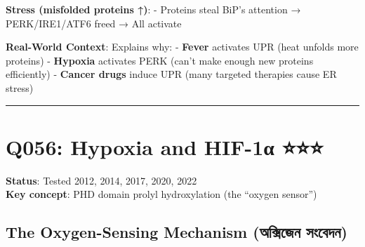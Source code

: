 \textbf{Stress (misfolded proteins ↑)}: - Proteins steal BiP's attention
→ PERK/IRE1/ATF6 freed → All activate

\textbf{Real-World Context}: Explains why: - \textbf{Fever} activates
UPR (heat unfolds more proteins) - \textbf{Hypoxia} activates PERK
(can't make enough new proteins efficiently) - \textbf{Cancer drugs}
induce UPR (many targeted therapies cause ER stress)

\begin{center}\rule{0.5\linewidth}{0.5pt}\end{center}

\hypertarget{q056-hypoxia-and-hif-1ux3b1}{%
\section{Q056: Hypoxia and HIF-1α
⭐⭐⭐}\label{q056-hypoxia-and-hif-1ux3b1}}

\textbf{Status}: Tested 2012, 2014, 2017, 2020, 2022\\
\textbf{Key concept}: PHD domain prolyl hydroxylation (the ``oxygen
sensor'')

\hypertarget{the-oxygen-sensing-mechanism-ux985ux995ux9b8ux99cux9a8-ux9b8ux9acux9a6ux9a8}{%
\subsection{\texorpdfstring{\textbf{The Oxygen-Sensing Mechanism}
(অক্সিজেন
সংবেদন)}{The Oxygen-Sensing Mechanism (অক্সিজেন সংবেদন)}}\label{the-oxygen-sensing-mechanism-ux985ux995ux9b8ux99cux9a8-ux9b8ux9acux9a6ux9a8}}

\begin{Shaded}
\begin{Highlighting}[]
    
\end{Highlighting}
\end{Shaded}

